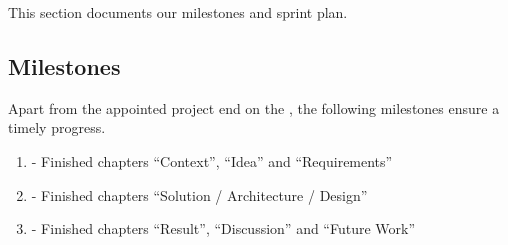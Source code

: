This section documents our milestones and sprint plan.

\subsection{Milestones}

Apart from the appointed project end on the , the following milestones ensure a timely progress.

\begin{enumerate}
\item \textbf{} - Finished chapters \enquote{Context}, \enquote{Idea} and \enquote{Requirements}
\item \textbf{} - Finished chapters \enquote{Solution / Architecture / Design}
\item \textbf{} - Finished chapters \enquote{Result}, \enquote{Discussion} and \enquote{Future Work}
\end{enumerate}
